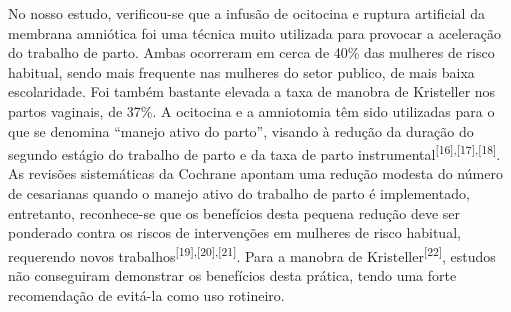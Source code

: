 \documentclass{article}
\begin{document}
No nosso estudo, verificou-se que a infusão de ocitocina e ruptura artificial da
membrana amniótica foi uma técnica muito utilizada para provocar a aceleração do
trabalho de parto. Ambas ocorreram em cerca de 40\% das mulheres de risco
habitual,
sendo mais frequente nas mulheres do setor publico, de mais baixa escolaridade.
Foi
também bastante elevada a taxa de manobra de Kristeller nos partos vaginais, de
37\%.
A ocitocina e a amniotomia têm sido utilizadas para o que se denomina “manejo
ativo
do parto”, visando à redução da duração do segundo estágio do trabalho de parto
e da
taxa de parto instrumental\textsuperscript{[}\textsuperscript{16}\textsuperscript{]}\textsuperscript{,}\textsuperscript{[}\textsuperscript{17}\textsuperscript{]}\textsuperscript{,}\textsuperscript{[}\textsuperscript{18}\textsuperscript{]}. As revisões sistemáticas da Cochrane apontam uma redução
modesta do número de cesarianas quando o manejo ativo do trabalho de parto é
implementado, entretanto, reconhece-se que os benefícios desta pequena redução
deve
ser ponderado contra os riscos de intervenções em mulheres de risco habitual,
requerendo novos trabalhos\textsuperscript{[}\textsuperscript{19}\textsuperscript{]}\textsuperscript{,}\textsuperscript{[}\textsuperscript{20}\textsuperscript{]}\textsuperscript{,}\textsuperscript{[}\textsuperscript{21}\textsuperscript{]}. Para a manobra de Kristeller\textsuperscript{[}\textsuperscript{22}\textsuperscript{]}, estudos não conseguiram demonstrar os benefícios
desta prática, tendo uma forte recomendação de evitá-la como uso rotineiro.
\end{document}
